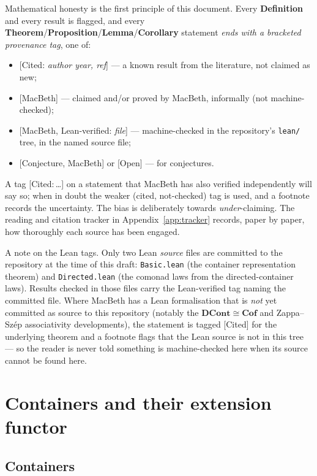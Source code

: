 \documentclass[11pt,a4paper]{book}
\newcommand{\Cof}{\mathbf{Cof}}
\newcommand{\DCont}{\mathbf{DCont}}
\theoremstyle{plain}
\theoremstyle{definition}
\theoremstyle{remark}
\begin{document}
Mathematical honesty is the first principle of this document. Every
\textbf{Definition} and every result is flagged, and every
\textbf{Theorem}/\textbf{Proposition}/\textbf{Lemma}/\textbf{Corollary}
statement \emph{ends with a bracketed provenance tag}, one of:
\begin{itemize}[nosep]
  \item \textsf{[Cited: \textit{author year, ref}]} --- a known result from the
        literature, not claimed as new;
  \item \textsf{[MacBeth]} --- claimed and/or proved by MacBeth, informally
        (not machine-checked);
  \item \textsf{[MacBeth, Lean-verified: \textit{file}]} --- machine-checked in
        the repository's \texttt{lean/} tree, in the named source file;
  \item \textsf{[Conjecture, MacBeth]} or \textsf{[Open]} --- for conjectures.
\end{itemize}
A tag \textsf{[Cited:\,\ldots]} on a statement that MacBeth has also verified
independently will say so; when in doubt the weaker (cited, not-checked) tag is
used, and a footnote records the uncertainty. The bias is deliberately towards
\emph{under}-claiming. The reading and citation tracker in
Appendix~\ref{app:tracker} records, paper by paper, how thoroughly each source
has been engaged.

A note on the Lean tags. Only two Lean \emph{source} files are committed to the
repository at the time of this draft: \texttt{Basic.lean} (the container
representation theorem) and \texttt{Directed.lean} (the comonad laws from the
directed-container laws). Results checked in those files carry the
\textsf{Lean-verified} tag naming the committed file. Where MacBeth has a Lean
formalisation that is \emph{not} yet committed as source to this repository
(notably the $\DCont\cong\Cof$ and Zappa--Sz\'ep associativity developments),
the statement is tagged \textsf{[Cited]} for the underlying theorem and a
footnote flags that the Lean source is not in this tree --- so the reader is
never told something is machine-checked here when its source cannot be found
here.

\mainmatter

\chapter{Containers and their extension functor}
\label{ch:cont}

\section{Containers}
\end{document}
